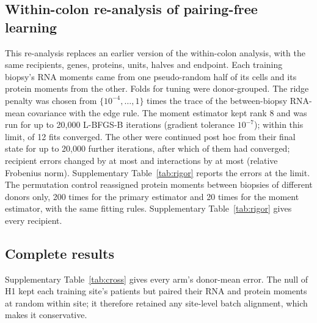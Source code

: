 \subsection*{Within-colon re-analysis of pairing-free learning}
This re-analysis replaces an earlier version of the within-colon analysis, with the same recipients, genes, proteins, units,
halves and endpoint. Each training biopsy's RNA moments came from one pseudo-random half
of its cells and its protein moments from the other. Folds for tuning were
donor-grouped. The ridge penalty was chosen from $\{10^{-4},\dots,1\}$ times the
trace of the between-biopsy RNA-mean covariance with the edge rule. The moment
estimator kept rank 8 and was run for up to 20,000 L-BFGS-B iterations
(gradient tolerance $10^{-7}$); within this limit, \XsRigConverged{} of 12 fits converged. The
other \XsRigContinued{} were continued post hoc from their final state for up to
20,000 further iterations, after
which \XsRigContinueConverged{} of them had converged; recipient errors changed by at
most \XsRigContinueMaxChange{} and interactions by at most \XsRigContinueMaxWChange{}
(relative Frobenius norm). Supplementary Table~\ref{tab:rigor} reports the errors
at the limit. The permutation control
reassigned protein moments between biopsies of different donors only, 200
times for the primary estimator and 20 times for the moment estimator, with
the same fitting rules. Supplementary Table~\ref{tab:rigor} gives every recipient.

\begin{table}[h]
\centering
\caption{\textbf{Within-colon pairing-free learning, corrected re-analysis.}
Relative cross-covariance error $E$ for each recipient, learned from the other
donors' biopsies without paired cells; $p$ is the donor-aware permutation
$p$-value (200 permutations for means, 20 for rank 8); $\dim M$ is the number
of gene directions the ridge estimator kept by at least one half. An asterisk
marks a rank-8 fit that stopped without meeting the convergence criterion.}
\label{tab:rigor}
\small

\end{table}

\subsection*{Complete results}
Supplementary Table~\ref{tab:cross} gives every arm's donor-mean error. The null of H1 kept
each training site's patients but paired their RNA and protein moments at
random within site; it therefore retained any site-level batch alignment,
which makes it conservative.

